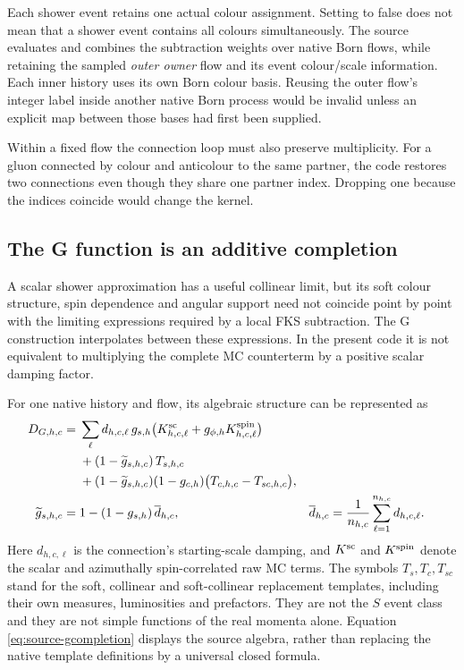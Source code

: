 Each shower event retains one actual colour assignment. Setting
 to false does not mean that a
shower event contains all colours simultaneously. The source evaluates and
combines the subtraction weights over native Born flows, while retaining
the sampled \emph{outer owner} flow and its event colour/scale information.
Each inner history uses its own Born colour basis. Reusing the outer flow's
integer label inside another native Born process would be invalid unless
an explicit map between those bases had first been supplied.

Within a fixed flow the connection loop must also preserve multiplicity.
For a gluon connected by colour and anticolour to the same partner, the
code restores two connections even though they share one partner index.
Dropping one because the indices coincide would change the kernel.

\subsection{The G function is an additive completion}
\label{sec:source-gfunction}

A scalar shower approximation has a useful collinear limit, but its soft
colour structure, spin dependence and angular support need not coincide
point by point with the limiting expressions required by a local FKS
subtraction. The G construction interpolates between these expressions. In
the present code it is not equivalent to multiplying the complete MC
counterterm by a positive scalar damping factor.

For one native history and flow, its algebraic structure can be represented
as
\begin{align}
 D_{G,h,c}={}&\sum_{\ell}d_{h,c,\ell}\,g_{s,h}
       \bigl(K^{\rm sc}_{h,c,\ell}
             +g_{\phi,h}K^{\rm spin}_{h,c,\ell}\bigr)
       \nonumber\\
 &+(1-\widetilde g_{s,h,c})\,T_{s,h,c}
       \nonumber\\
 &+(1-\widetilde g_{s,h,c})(1-g_{c,h})
       \bigl(T_{c,h,c}-T_{sc,h,c}\bigr),
 \label{eq:source-gcompletion}\\
 \widetilde g_{s,h,c}
 ={}&1-(1-g_{s,h})\,\overline d_{h,c},
 &\overline d_{h,c}
 ={}&\frac{1}{n_{h,c}}\sum_{\ell=1}^{n_{h,c}}d_{h,c,\ell}.
 \label{eq:source-effectiveg}
\end{align}
Here $d_{h,c,\ell}$ is the connection's starting-scale damping, and
$K^{\rm sc}$ and $K^{\rm spin}$ denote the scalar and azimuthally
spin-correlated raw MC terms. The symbols $T_s,T_c,T_{sc}$ stand for the
soft, collinear and soft-collinear replacement templates, including their
own measures, luminosities and prefactors. They are not the $S$ event class
and they are not simple functions of the real momenta alone. Equation
\eqref{eq:source-gcompletion} displays the source algebra, rather than
replacing the native template definitions by a universal closed formula.

